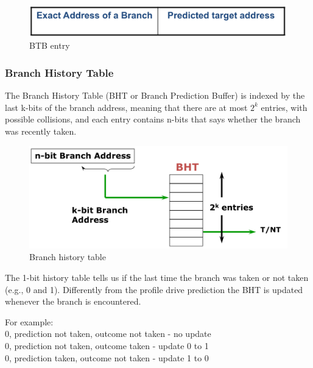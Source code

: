 \begin{figure}[h]
    \centering
    \includegraphics[scale = 0.4]{images/branch-target-buffer-entry}
    \caption{BTB entry}
    \label{fig:btb-entry}
\end{figure}


\subsubsection{Branch History Table}
The Branch History Table (BHT or Branch Prediction Buffer) is indexed by the last k-bits of the branch address, meaning
that there are at most $2^k$ entries, with possible collisions, and each entry contains n-bits that says whether the
branch was recently taken.

\begin{figure}[h]
    \centering
    \includegraphics[scale = 0.4]{images/branch-history-table}
    \caption{Branch history table}
    \label{fig:branch-history-table}
\end{figure}

The 1-bit history table tells us if the last time the branch was taken or not taken (e.g., 0 and 1).
Differently from the profile drive prediction the BHT is updated whenever the branch is encountered.

For example:\\
0, prediction not taken, outcome not taken - no update\\
0, prediction not taken, outcome taken - update 0 to 1\\
0, prediction taken, outcome not taken - update 1 to 0\\

